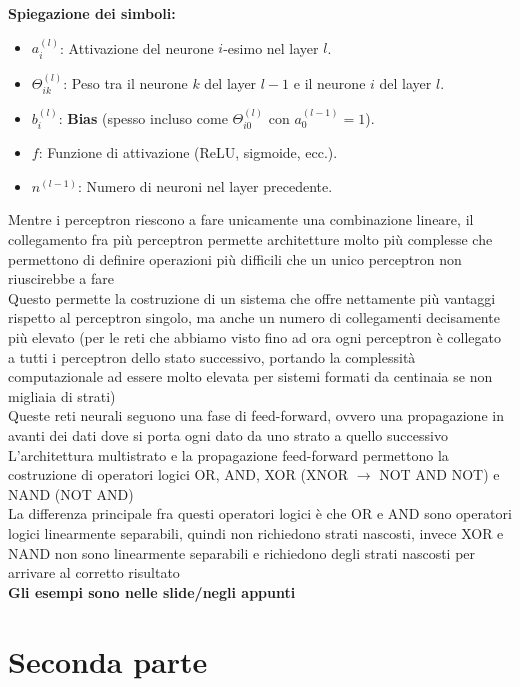 \documentclass[10pt,oneside,a4paper]{article}
\begin{document}
	\textbf{Spiegazione dei simboli:}
	\begin{itemize}
		\item $a_i^{(l)}$: Attivazione del neurone $i$-esimo nel layer $l$.
		\item $\Theta_{ik}^{(l)}$: Peso tra il neurone $k$ del layer $l-1$ e il neurone $i$ del layer $l$.
		\item $b_i^{(l)}$: \textbf{Bias} (spesso incluso come $\Theta_{i0}^{(l)}$ con $a_0^{(l-1)} = 1$).
		\item $f$: Funzione di attivazione (ReLU, sigmoide, ecc.).
		\item $n^{(l-1)}$: Numero di neuroni nel layer precedente.
	\end{itemize}
	Mentre i perceptron riescono a fare unicamente una combinazione lineare, il collegamento fra più perceptron permette architetture molto più complesse che permettono di definire operazioni più difficili che un unico perceptron non riuscirebbe a fare\\
	Questo permette la costruzione di un sistema che offre nettamente più vantaggi rispetto al perceptron singolo, ma anche un numero di collegamenti decisamente più elevato (per le reti che abbiamo visto fino ad ora ogni perceptron è collegato a tutti i perceptron dello stato successivo, portando la complessità computazionale ad essere molto elevata per sistemi formati da centinaia se non migliaia di strati)\\
	Queste reti neurali seguono una fase di feed-forward, ovvero una propagazione in avanti dei dati dove si porta ogni dato da uno strato a quello successivo\\
	L'architettura multistrato e la propagazione feed-forward permettono la costruzione di operatori logici OR, AND, XOR (XNOR $\to$ NOT AND NOT) e NAND (NOT AND)\\
	La differenza principale fra questi operatori logici è che OR e AND sono operatori logici linearmente separabili, quindi non richiedono strati nascosti, invece XOR e NAND non sono linearmente separabili e richiedono degli strati nascosti per arrivare al corretto risultato\\
	\textbf{Gli esempi sono nelle slide/negli appunti}	
		
	
	\newpage
	\section{Seconda parte}
\end{document}
